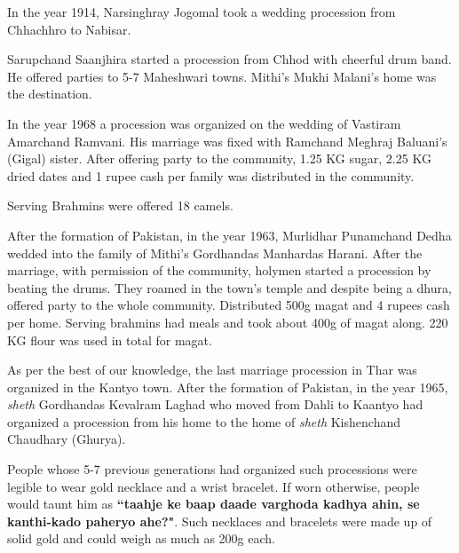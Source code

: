 In the year 1914, Narsinghray Jogomal took a wedding procession from Chhachhro
to Nabisar.

Sarupchand Saanjhira started a procession from Chhod with cheerful drum band.
He offered parties to 5-7 Maheshwari towns. Mithi's Mukhi Malani's home was the
destination.

In the year 1968 a procession was organized on the wedding of Vastiram
Amarchand Ramvani. His marriage was fixed with Ramchand Meghraj Baluani's
(Gigal) sister. After offering party to the community, 1.25 KG sugar, 2.25 KG
dried dates and 1 rupee cash per family was distributed in the community.

Serving Brahmins were offered 18 camels.

After the formation of Pakistan, in the year 1963, Murlidhar Punamchand Dedha
wedded into the family of Mithi's Gordhandas Manhardas Harani. After the
marriage, with permission of the community, holymen started a procession by
beating the drums. They roamed in  the town's temple and despite being a dhura,
offered party to the whole community. Distributed 500g magat and 4 rupees cash
per home. Serving brahmins had meals and took about 400g of magat along. 220 KG
flour was used in total for magat.

As per the best of our knowledge, the last marriage procession in Thar was
organized in the Kantyo town. After the formation of Pakistan, in the year
1965, \textit{sheth} Gordhandas Kevalram Laghad who moved from Dahli to Kaantyo
had organized a procession from his home to the home of \textit{sheth}
Kishenchand Chaudhary (Ghurya).

People whose 5-7 previous generations had organized such processions were
legible to wear gold necklace and a wrist bracelet. If worn otherwise, people
would taunt him as \textbf{``taahje ke baap daade varghoda kadhya ahin, se
kanthi-kado paheryo ahe?"}. Such necklaces and bracelets were made up of solid
gold and could weigh as much as 200g each.

